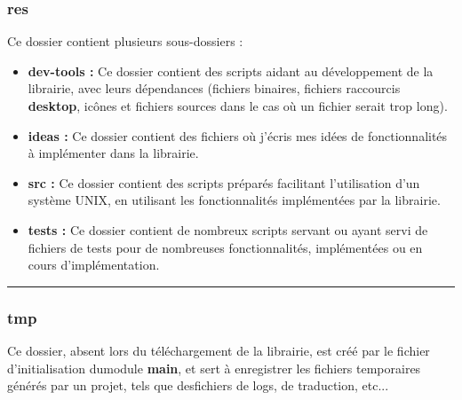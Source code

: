 \documentclass[a4paper,10pt]{article}
\begin{document}
\subsubsection{res}\color{white}
Ce dossier contient plusieurs sous-dossiers :
\begin{itemize}
    \item \textbf{\color{lime}dev-tools\color{white} :} Ce dossier contient des scripts aidant au développement de la librairie, avec leurs dépendances (fichiers binaires, fichiers raccourcis \textbf{desktop}, icônes et fichiers sources dans le cas où un fichier serait trop long).\\[1\baselineskip]

    \item \textbf{\color{lime}ideas\color{white} :} Ce dossier contient des fichiers où j'écris mes idées de fonctionnalités à implémenter dans la librairie.\\[1\baselineskip]

    \item \textbf{\color{lime}src\color{white} :} Ce dossier contient des scripts préparés facilitant l'utilisation d'un système UNIX, en utilisant les fonctionnalités implémentées par la librairie.\\[1\baselineskip]

    \item \textbf{\color{lime}tests\color{white} :} Ce dossier contient de nombreux scripts servant ou ayant servi de fichiers de tests pour de nombreuses fonctionnalités, implémentées ou en cours d'implémentation.\\[1\baselineskip]
\end{itemize}



\color{blue}\par\noindent\rule{\textwidth}{0.4pt}\color{white}

\color{blue}
\subsubsection{tmp}\color{white}
Ce dossier, absent lors du téléchargement de la librairie, est créé par le fichier d'initialisation du\linebreak module \textbf{main}, et sert à enregistrer les fichiers temporaires générés par un projet, tels que des\linebreak fichiers de logs, de traduction, etc...\\[1\baselineskip]
\end{document}
